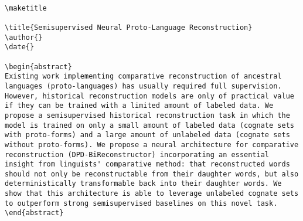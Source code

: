 \begin{table}[ht!]
\centering
\begin{minipage}{\linewidth}
\lstset{
    basicstyle=\ttfamily\footnotesize, %
    breaklines=true, %
    frame=single, %
    columns=fullflexible, %
    captionpos=b %
}
\begin{lstlisting}

\maketitle

\title{Semisupervised Neural Proto-Language Reconstruction}
\author{}
\date{}

\begin{abstract}
Existing work implementing comparative reconstruction of ancestral languages (proto-languages) has usually required full supervision. However, historical reconstruction models are only of practical value if they can be trained with a limited amount of labeled data. We propose a semisupervised historical reconstruction task in which the model is trained on only a small amount of labeled data (cognate sets with proto-forms) and a large amount of unlabeled data (cognate sets without proto-forms). We propose a neural architecture for comparative reconstruction (DPD-BiReconstructor) incorporating an essential insight from linguists' comparative method: that reconstructed words should not only be reconstructable from their daughter words, but also deterministically transformable back into their daughter words. We show that this architecture is able to leverage unlabeled cognate sets to outperform strong semisupervised baselines on this novel task.
\end{abstract}



\end{lstlisting}
\vspace{-3mm}
\label{table:seed-entry-semi}
\end{minipage}
\end{table}

